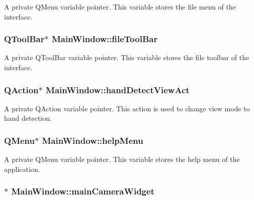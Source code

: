 \label{classMainWindow_a426da48f6e2f865b07a28533c07c4f7a}
A private QMenu variable pointer. This variable stores the file menu of the interface. \hypertarget{classMainWindow_a0a352c6d66b7a080fcf558874a7e51d4}{
\subsubsection[{fileToolBar}]{\setlength{\rightskip}{0pt plus 5cm}QToolBar$\ast$ {\bf MainWindow::fileToolBar}}}
\label{classMainWindow_a0a352c6d66b7a080fcf558874a7e51d4}
A private QToolBar variable pointer. This variable stores the file toolbar of the interface. \hypertarget{classMainWindow_ac2f865b7d3f7d72aba7f76281528c3d3}{
\subsubsection[{handDetectViewAct}]{\setlength{\rightskip}{0pt plus 5cm}QAction$\ast$ {\bf MainWindow::handDetectViewAct}}}
\label{classMainWindow_ac2f865b7d3f7d72aba7f76281528c3d3}
A private QAction variable pointer. This action is used to change view mode to hand detection. \hypertarget{classMainWindow_a947c15e520bfea60338b2577f67146b8}{
\subsubsection[{helpMenu}]{\setlength{\rightskip}{0pt plus 5cm}QMenu$\ast$ {\bf MainWindow::helpMenu}}}
\label{classMainWindow_a947c15e520bfea60338b2577f67146b8}
A private QMenu variable pointer. This variable stores the help menu of the application. \hypertarget{classMainWindow_a8a71bdff27e71941a425a96a795443b5}{
\subsubsection[{mainCameraWidget}]{$\ast$ {\bf MainWindow::mainCameraWidget}}}
